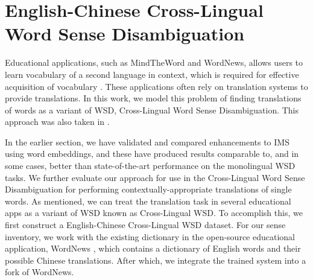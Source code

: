 \section{English-Chinese Cross-Lingual Word Sense Disambiguation}
\label{section:CLWSD}






Educational applications, such as MindTheWord and WordNews, allows users to learn vocabulary of a second language in context, which is required for effective acquisition of vocabulary \cite{Hirsch03readingcomprehension}. These applications often rely on translation systems to provide translations. In this work, we model this problem of finding translations of words as a variant of WSD, Cross-Lingual Word Sense Disambiguation. This approach was also taken in \cite{tao2014}.

In the earlier section, we have validated and compared enhancements to IMS using word embeddings, and these have produced results comparable to, and in some cases, better than state-of-the-art performance on the monolingual WSD tasks. We further evaluate our approach for use in the Cross-Lingual Word Sense Disambiguation for performing contextually-appropriate translations of single words. As mentioned, we can treat the translation task in several educational apps as a variant of WSD known as Cross-Lingual WSD. To accomplish this, we first construct a English-Chinese Cross-Lingual WSD dataset. For our sense inventory, we work with the existing dictionary in the open-source educational application, WordNews \cite{tao2014}, which contains a dictionary of English words and their possible Chinese translations. After which, we integrate the trained system into a fork of WordNews. 

